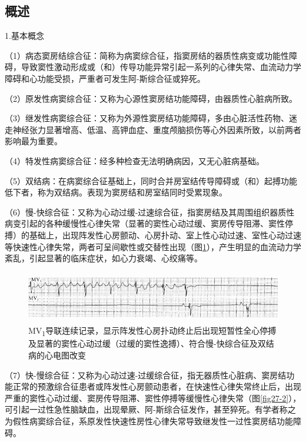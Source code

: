 \protect\hypertarget{text00034.htmlux5cux23subid409}{}{}

\subsection{概述}

1.基本概念

（1）病态窦房结综合征：简称为病窦综合征，指窦房结的器质性病变或功能性障碍，导致窦性激动形成或（和）传导功能异常引起一系列的心律失常、血流动力学障碍和心功能受损，严重者可发生阿-斯综合征或猝死。

（2）原发性病窦综合征：又称为心源性窦房结功能障碍，由器质性心脏病所致。

（3）继发性病窦综合征：又称为外源性窦房结功能障碍，多由心脏活性药物、迷走神经张力显著增高、低温、高钾血症、重度颅脑损伤等心外因素所致，以前两者影响最为重要。

（4）特发性病窦综合征：经多种检查无法明确病因，又无心脏病基础。

（5）双结病：在病窦综合征基础上，同时合并房室结传导障碍或（和）起搏功能低下者，称为双结病。表现为窦房结和房室结同时受累现象。

（6）慢-快综合征：又称为心动过缓-过速综合征，指窦房结及其周围组织器质性病变引起的各种缓慢性心律失常（显著的窦性心动过缓、窦房传导阻滞、窦性停搏）的基础上，出现阵发性心房颤动、心房扑动、室上性心动过速、室性心动过速等快速性心律失常，两者可呈间歇性或交替性出现（图\ref{fig27-1}），产生明显的血流动力学紊乱，引起显著的临床症状，如心力衰竭、心绞痛等。

\begin{figure}[!htbp]
 \centering
 \includegraphics[width=5.58333in,height=0.88542in]{./images/Image00456.jpg}
 \captionsetup{justification=centering}
 \caption{MV\textsubscript{1}导联连续记录，显示阵发性心房扑动终止后出现短暂性全心停搏及显著的窦性心动过缓（过缓的窦性逸搏）、符合慢-快综合征及双结病的心电图改变}
 \label{fig27-1}
  \end{figure} 


（7）快-慢综合征：又称为心动过速-过缓综合征，指无器质性心脏病、窦房结功能正常的预激综合征患者或阵发性心房颤动患者，在快速性心律失常终止后，出现严重的窦性心动过缓、窦房传导阻滞、窦性停搏等缓慢性心律失常（图\ref{fig27-2}），可引起一过性急性脑缺血，出现晕厥、阿-斯综合征发作，甚至猝死。有学者称之为假性病窦综合征，系原发性快速性房性心律失常导致继发性一过性窦房结功能障碍。


